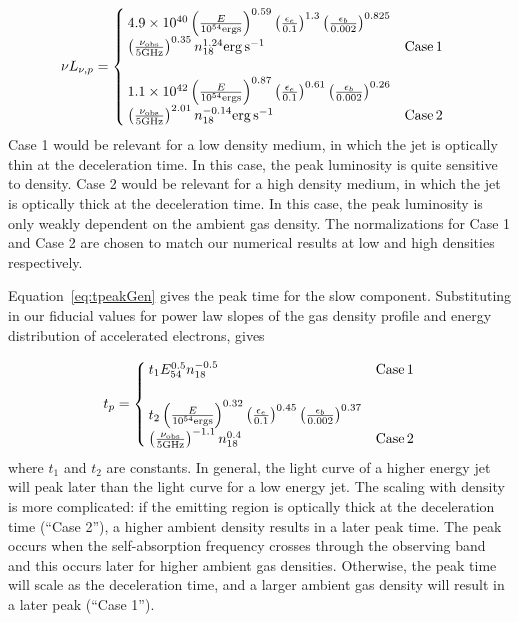 \documentclass[usenatbib,fleqn]{mnras}
\begin{document}
\begin{align}
\nu L_{\nu, p}&=
\begin{cases}
  4.9\times 10^{40} \left(\frac{E}{10^{54} {\rm ergs}}\right)^{0.59}
  \left(\frac{\epsilon_e}{0.1}\right)^{1.3}
  \left(\frac{\epsilon_b}{0.002}\right)^{0.825}\\
  \left(\frac{\nu_{\rm obs}}{5 {\rm GHz}}\right)^{0.35} n_{18}^{1.24} 
  {\rm erg \, s^{-1}} & {\rm Case \,1}\\\\
 1.1 \times 10^{42}  \left(\frac{E}{10^{54} {\rm ergs}}\right)^{0.87}
  \left(\frac{\epsilon_e}{0.1}\right)^{0.61}
  \left(\frac{\epsilon_b}{0.002}\right)^{0.26}\\
  \left(\frac{\nu_{\rm obs}}{5 {\rm GHz}}\right)^{2.01} n_{18}^{-0.14}
  {\rm erg\, s^{-1}} & {\rm Case \,2}
\end{cases}
\label{eq:peakLum}
\end{align}
%
Case 1 would be relevant for a low density medium, in which the jet is
optically thin at the deceleration time. In this case, the peak
luminosity is quite sensitive to density. Case 2 would be relevant for
a high density medium, in which the jet is optically thick at the
deceleration time. In this case, the peak luminosity is only weakly
dependent on the ambient gas density. The normalizations for Case 1
and Case 2 are chosen to match our numerical results at low and high
densities respectively.

Equation~\eqref{eq:tpeakGen} gives the peak time for the slow
component. Substituting in our fiducial values for power law slopes of
the gas density profile and energy distribution of accelerated
electrons, gives


\begin{align}
t_p=
\begin{cases}
  t_1 E_{54}^{0.5} n_{18}^{-0.5} & {\rm Case \, 1}\\\\
  t_2 \left(\frac{E}{10^{54} {\rm ergs}}\right)^{0.32}
  \left(\frac{\epsilon_e}{0.1}\right)^{0.45}
  \left(\frac{\epsilon_b}{0.002}\right)^{0.37}\\
  \left(\frac{\nu_{\rm obs}}{5 {\rm GHz}}\right)^{-1.1} n_{18}^{0.4} &
  {\rm Case \, 2}
\end{cases}
\label{eq:peakTime}
\end{align}
%
where $t_1$ and $t_2$ are constants. In general, the light curve of a
higher energy jet will peak later than the light curve for a low
energy jet. The scaling with density is more complicated: if the
emitting region is optically thick at the deceleration time (``Case
2''), a higher ambient density results in a later peak time. The peak
occurs when the self-absorption frequency crosses through the
observing band and this occurs later for higher ambient gas
densities. Otherwise, the peak time will scale as the deceleration
time, and a larger ambient gas density will result in a later peak
(``Case 1'').
\end{document}
